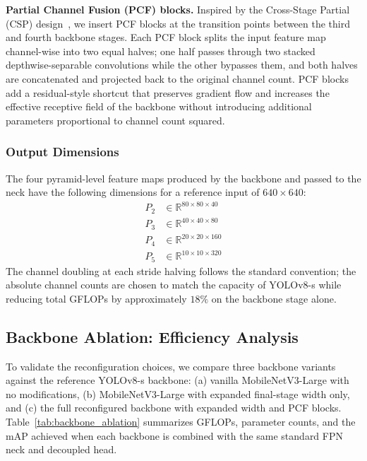 \textbf{Partial Channel Fusion (PCF) blocks.}  Inspired by the
Cross-Stage Partial (CSP) design~\cite{bochkovskiy2020yolov4},
we insert PCF blocks at the transition points between the third
and fourth backbone stages.  Each PCF block splits the input
feature map channel-wise into two equal halves; one half passes
through two stacked depthwise-separable convolutions while the
other bypasses them, and both halves are concatenated and
projected back to the original channel count.  PCF blocks add
a residual-style shortcut that preserves gradient flow and
increases the effective receptive field of the backbone without
introducing additional parameters proportional to channel
count squared.

\subsubsection{Output Dimensions}

The four pyramid-level feature maps produced by the backbone
and passed to the neck have the following dimensions for a
reference input of $640 \times 640$:
\begin{align}
    P_2 &\in \mathbb{R}^{80 \times 80 \times 40}  \label{eq:p2} \\
    P_3 &\in \mathbb{R}^{40 \times 40 \times 80}  \label{eq:p3} \\
    P_4 &\in \mathbb{R}^{20 \times 20 \times 160} \label{eq:p4} \\
    P_5 &\in \mathbb{R}^{10 \times 10 \times 320} \label{eq:p5}
\end{align}
The channel doubling at each stride halving follows the
standard convention; the absolute channel counts are chosen to
match the capacity of YOLOv8-s while reducing total GFLOPs by
approximately $18\%$ on the backbone stage alone.

\subsection{Backbone Ablation: Efficiency Analysis}

To validate the reconfiguration choices, we compare three
backbone variants against the reference YOLOv8-s backbone:
(a) vanilla MobileNetV3-Large with no modifications, (b)
MobileNetV3-Large with expanded final-stage width only, and (c)
the full reconfigured backbone with expanded width and PCF
blocks.  Table~\ref{tab:backbone_ablation} summarizes
GFLOPs, parameter counts, and the mAP achieved when each
backbone is combined with the same standard FPN neck and
decoupled head.

